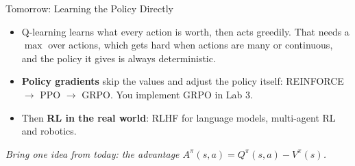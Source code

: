 \begin{frame}{Tomorrow: Learning the Policy Directly}
\begin{itemize}\itemsep0.7em
    \item Q-learning learns what every action is worth, then acts greedily. That needs a
          $\max$ over actions, which gets hard when actions are many or continuous, and
          the policy it gives is always deterministic.
    \item \textbf{Policy gradients} skip the values and adjust the policy itself:
          REINFORCE $\rightarrow$ PPO $\rightarrow$ GRPO. You implement GRPO in Lab 3.
    \item Then \textbf{RL in the real world}: RLHF for language models, multi-agent RL and
          robotics.
\end{itemize}
\vfill
\begin{center}
\itshape Bring one idea from today: the advantage
$A^{\pi}(s,a) = Q^{\pi}(s,a) - V^{\pi}(s)$.
\end{center}
\end{frame}
